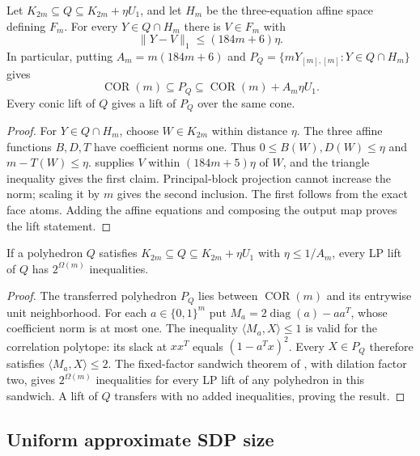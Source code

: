 \begin{theorem}\label{app:outer-transfer}
Let $K_{2m}\subseteq Q\subseteq K_{2m}+\eta U_1$, and let $H_m$
be the three-equation affine space defining $F_m$. For every
$Y\in Q\cap H_m$ there is $V\in F_m$ with
\[
 \|Y-V\|_1\le(184m+6)\eta.
\]
In particular, putting $A_m=m(184m+6)$ and
$P_Q=\{mY_{[m],[m]}:Y\in Q\cap H_m\}$ gives
\[
 \operatorname{COR}(m)\subseteq P_Q
 \subseteq\operatorname{COR}(m)+A_m\eta U_1.
\]
Every conic lift of $Q$ gives a lift of $P_Q$ over the same cone.
\end{theorem}
\begin{proof}
For $Y\in Q\cap H_m$, choose $W\in K_{2m}$ within distance $\eta$.
The three affine functions $B,D,T$ have coefficient norms one. Thus
$0\le B(W),D(W)\le\eta$ and $m-T(W)\le\eta$.
 supplies $V$ within $(184m+5)\eta$ of $W$,
and the triangle inequality gives the first claim. Principal-block
projection cannot increase the norm; scaling it by $m$ gives the
second inclusion. The first follows from the exact face atoms.
Adding the affine equations and composing the output map proves the
lift statement.
\end{proof}

\begin{corollary}\label{app:approx-lp}
If a polyhedron $Q$ satisfies
$K_{2m}\subseteq Q\subseteq K_{2m}+\eta U_1$ with
$\eta\le1/A_m$, every LP lift of $Q$ has $2^{\Omega(m)}$ inequalities.
\end{corollary}
\begin{proof}
The transferred polyhedron $P_Q$ lies between $\operatorname{COR}(m)$
and its entrywise unit neighborhood. For each $a\in\{0,1\}^m$ put
$M_a=2\operatorname{diag}(a)-aa^T$, whose coefficient norm is at most
one. The inequality $\langle M_a,X\rangle\le1$ is valid for the
correlation polytope: its slack at $xx^T$ equals $(1-a^Tx)^2$.
Every $X\in P_Q$ therefore satisfies $\langle M_a,X\rangle\le2$.
The fixed-factor sandwich theorem of
\citet[Theorem~6(i), author manuscript]{s6:bfps2015}, with dilation
factor two, gives $2^{\Omega(m)}$ inequalities for every LP lift of
any polyhedron in this sandwich. A lift of $Q$ transfers with no added
inequalities, proving the result.
\end{proof}

\subsection{Uniform approximate SDP size}


